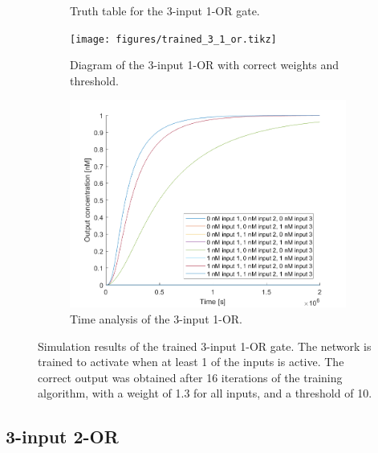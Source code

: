 \begin{figure}[H]
\begin{subfigure}[t]{.49\columnwidth}
\begin{adjustbox}{width=\textwidth}
\begin{tabular}[b]{cccc}
    \hline
    \end{tabular}
  \end{adjustbox}
    \caption{Truth table for the 3-input 1-OR gate.}
    \label{and_table}
\end{subfigure}
\begin{subfigure}[t]{.49\textwidth}
  \texttt{[image: figures/trained\_3\_1\_or.tikz]}
  \caption{Diagram of the 3-input 1-OR with correct weights and threshold.}
\end{subfigure}
\hfill
\begin{subfigure}[t]{\textwidth}
  \centering
\includegraphics[width=\textwidth]{images/or_1_simulation_3input.png}
\caption{Time analysis of the 3-input 1-OR.}
\label{}
\end{subfigure}
\caption{Simulation results of the trained 3-input 1-OR gate. The network is trained to activate when at least 1 of the inputs is active. The correct output was obtained after 16 iterations of the training algorithm, with a weight of 1.3 for all inputs, and a threshold of 10.}
\end{figure}

\subsection{3-input 2-OR}


